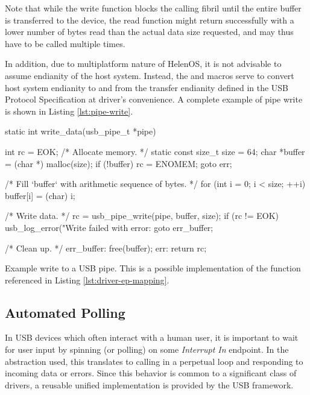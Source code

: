 Note that while the write function blocks the calling fibril until the entire
buffer is transferred to the device, the read function might return successfully
with a lower number of bytes read than the actual data size requested, and may
thus have to be called multiple times.

In addition, due to multiplatform nature of HelenOS, it is not advisable to
assume endianity of the host system. Instead, the 
and  macros serve to convert host system endianity
to and from the transfer endianity defined in the USB Protocol Specification at
driver's convenience. A complete example of pipe write is shown in Listing
\ref{lst:pipe-write}.

\begin{listing}
	\begin{code}
		static int write_data(usb_pipe_t *pipe)
		{
			int rc = EOK;
			/* Allocate memory. */
			static const size_t size = 64;
			char *buffer = (char *) malloc(size);
			if (!buffer) {
				rc = ENOMEM;
				goto err;
			}

			/* Fill `buffer` with arithmetic sequence of bytes. */
			for (int i = 0; i < size; ++i) buffer[i] = (char) i;

			/* Write data. */
			rc = usb_pipe_write(pipe, buffer, size);
			if (rc != EOK) {
				usb_log_error("Write failed with error: %
				goto err_buffer;
			}

			/* Clean up. */
		err_buffer:
			free(buffer);
		err:
			return rc;
		}
	\end{code}
	\caption[Example write to a USB pipe.]{Example write to a USB pipe. This is
	a possible implementation of the  function referenced in
	Listing \ref{lst:driver-ep-mapping}.}
	\label{lst:pipe-write}
\end{listing}


\subsection{Automated Polling}

In USB devices which often interact with a human user, it is important to wait
for user input by spinning (or polling) on some \textit{Interrupt In} endpoint.
In the abstraction used, this translates to calling  in a
perpetual loop and responding to incoming data or errors. Since this behavior is
common to a significant class of drivers, a reusable unified implementation is
provided by the USB framework.

